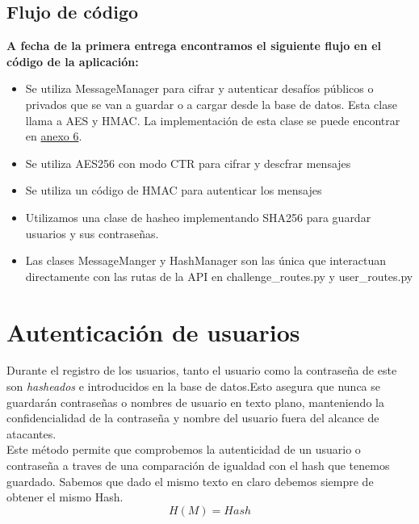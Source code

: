 \documentclass[a4paper,11pt]{article}
\begin{document}
\vspace{0.5cm}

\subsection{Flujo de código}
\textbf{A fecha de la primera entrega encontramos el siguiente flujo en el código de la aplicación:} 
\begin{itemize}
    \item Se utiliza MessageManager para cifrar y autenticar desafíos públicos o privados que se van a guardar o a cargar desde la base de datos. Esta clase llama a AES y HMAC. La implementación de esta clase se puede encontrar en \hyperref[sec:MessageManagerCode]{anexo 6}.
    \item Se utiliza AES256 con modo CTR para cifrar y descfrar mensajes
    \item Se utiliza un código de HMAC para autenticar los mensajes
    \item Utilizamos una clase de hasheo implementando SHA256 para guardar usuarios y sus contraseñas.
    \item Las clases MessageManger y HashManager son las única que interactuan directamente con las rutas de la API en challenge\_routes.py y user\_routes.py
\end{itemize}

\section{Autenticación de usuarios}
\label{sec:autenticacionUsuarios}
Durante el registro de los usuarios, tanto el usuario como la contraseña de este
son \textit{hasheados} e introducidos en la base de datos.Esto asegura que nunca
se guardarán contraseñas o nombres de usuario en texto plano, manteniendo la
confidencialidad de la contraseña y nombre del usuario fuera del alcance de atacantes.
\\
Este método permite que comprobemos la autenticidad de un usuario o
contraseña a traves de una comparación de igualdad con el hash que tenemos
guardado. Sabemos que dado el mismo texto en claro debemos siempre de obtener el
mismo Hash.
$$H(M) = Hash$$
\end{document}
